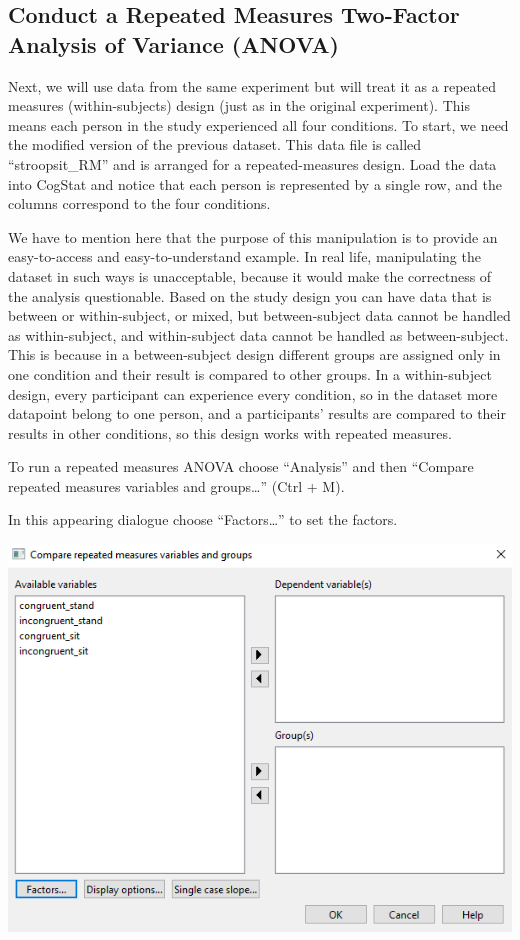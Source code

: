 \documentclass[
]{book}
\begin{document}
\hypertarget{conduct-a-repeated-measures-two-factor-analysis-of-variance-anova-1}{%
\subsection{Conduct a Repeated Measures Two-Factor Analysis of Variance (ANOVA)}\label{conduct-a-repeated-measures-two-factor-analysis-of-variance-anova-1}}

Next, we will use data from the same experiment but will treat it as a repeated measures (within-subjects) design (just as in the original experiment). This means each person in the study experienced all four conditions. To start, we need the modified version of the previous dataset. This data file is called ``stroopsit\_RM'' and is arranged for a repeated-measures design. Load the data into CogStat and notice that each person is represented by a single row, and the columns correspond to the four conditions.

We have to mention here that the purpose of this manipulation is to provide an easy-to-access and easy-to-understand example. In real life, manipulating the dataset in such ways is unacceptable, because it would make the correctness of the analysis questionable. Based on the study design you can have data that is between or within-subject, or mixed, but between-subject data cannot be handled as within-subject, and within-subject data cannot be handled as between-subject. This is because in a between-subject design different groups are assigned only in one condition and their result is compared to other groups. In a within-subject design, every participant can experience every condition, so in the dataset more datapoint belong to one person, and a participants' results are compared to their results in other conditions, so this design works with repeated measures.

To run a repeated measures ANOVA choose ``Analysis'' and then ``Compare repeated measures variables and groups\ldots{}'' (Ctrl + M).

In this appearing dialogue choose ``Factors\ldots{}'' to set the factors.

\includegraphics{img/ch10/10.5CRMV_window_factors.png}
\end{document}
